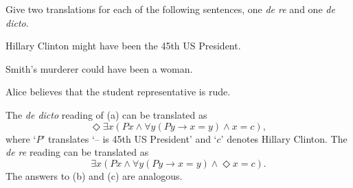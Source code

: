 \begin{exercise}
  Give two translations for each of the following sentences, one \emph{de re} and one \emph{de dicto}.
  \begin{exlist}
  \item Hillary Clinton might have been the 45th US President.
  \item Smith's murderer could have been a woman.
  \item Alice believes that the student representative is rude.
  \end{exlist}
\end{exercise}
\begin{solution}
  The \emph{de dicto} reading of (a) can be translated as
  \begin{equation*}
    \Diamond \exists x (Px \land \forall y(Py \to x\!=\!y) \land x\!=\!c),%
  \end{equation*}
  where `$P$' translates `-- is 45th US President' and `$c$' denotes Hillary
  Clinton. The \emph{de re} reading can be translated as
  \begin{equation*}
    \exists x (Px \land \forall y(Py \to x\!=\!y) \land \Diamond x\!=\!c).
  \end{equation*}
  The answers to (b) and (c) are analogous.
\end{solution}



